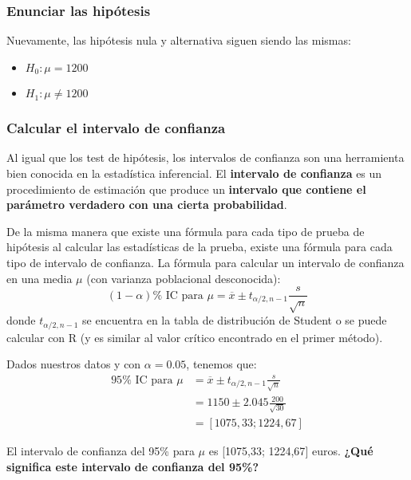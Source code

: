 \documentclass[
]{book}
\providecommand{\tightlist}{%
  \setlength{\itemsep}{0pt}\setlength{\parskip}{0pt}}
\begin{document}
\hypertarget{enunciar-las-hipuxf3tesis}{%
\subsubsection{Enunciar las hipótesis}\label{enunciar-las-hipuxf3tesis}}

Nuevamente, las hipótesis nula y alternativa siguen siendo las mismas:

\begin{itemize}
\tightlist
\item
  \(H_0:\mu = 1200\)
\item
  \(H_1:\mu\ne 1200\)
\end{itemize}

\hypertarget{calcular-el-intervalo-de-confianza}{%
\subsubsection{Calcular el intervalo de confianza}\label{calcular-el-intervalo-de-confianza}}

Al igual que los test de hipótesis, los intervalos de confianza son una herramienta bien conocida en la estadística inferencial. El \textbf{intervalo de confianza} es un procedimiento de estimación que produce un \textbf{intervalo que contiene el parámetro verdadero con una cierta probabilidad}.

De la misma manera que existe una fórmula para cada tipo de prueba de hipótesis al calcular las estadísticas de la prueba, existe una fórmula para cada tipo de intervalo de confianza. La fórmula para calcular un intervalo de confianza en una media \(\mu\) (con varianza poblacional desconocida):
\[
(1-\alpha)\% \text{ IC para } \mu=\overline{x}\pm t_{\alpha/2, n - 1}\frac{s}{\sqrt{n}}
\]
donde \(t_{\alpha/2, n-1}\) se encuentra en la tabla de distribución de Student o se puede calcular con R (y es similar al valor crítico encontrado en el primer método).

Dados nuestros datos y con \(\alpha= 0.05\), tenemos que:
\[
\begin{aligned}
 95\%\text{ IC para } \mu 
    &= \overline{x} \pm t_{\alpha/2, n - 1} \frac{s}{\sqrt{n}} \\
    &= 1150 \pm 2.045 \frac{200}{\sqrt{30}} \\
    &= [1075,33; 1224,67]
\end{aligned}
\]

El intervalo de confianza del 95\% para \(\mu\) es {[}1075,33; 1224,67{]} euros. \textbf{¿Qué significa este intervalo de confianza del 95\%? }
\end{document}
